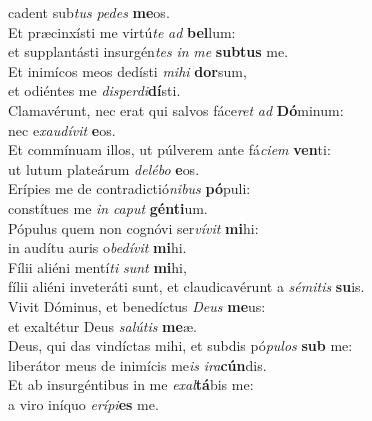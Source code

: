 \evenverse cadent sub\textit{tus} \textit{pe}\textit{des} \textbf{me}os.\\
\oddverse Et præcinxísti me virtú\textit{te} \textit{ad} \textbf{bel}lum:~\*\\
\oddverse et supplantásti insurgén\textit{tes} \textit{in} \textit{me} \textbf{sub}\textbf{tus} me.\\
\evenverse Et inimícos meos dedísti \textit{mi}\textit{hi} \textbf{dor}sum,~\*\\
\evenverse et odiéntes me \textit{di}\textit{sper}\textit{di}\textbf{dí}sti.\\
\oddverse Clamavérunt, nec erat qui salvos fáce\textit{ret} \textit{ad} \textbf{Dó}minum:~\*\\
\oddverse nec e\textit{xau}\textit{dí}\textit{vit} \textbf{e}os.\\
\evenverse Et commínuam illos, ut púlverem ante fá\textit{ci}\textit{em} \textbf{ven}ti:~\*\\
\evenverse ut lutum plateárum \textit{de}\textit{lé}\textit{bo} \textbf{e}os.\\
\oddverse Erípies me de contradictió\textit{ni}\textit{bus} \textbf{pó}puli:~\*\\
\oddverse constítues me \textit{in} \textit{ca}\textit{put} \textbf{gén}\textbf{ti}um.\\
\evenverse Pópulus quem non cognóvi ser\textit{ví}\textit{vit} \textbf{mi}hi:~\*\\
\evenverse in audítu auris o\textit{be}\textit{dí}\textit{vit} \textbf{mi}hi.\\
\oddverse Fílii aliéni mentí\textit{ti} \textit{sunt} \textbf{mi}hi,~\*\\
\oddverse fílii aliéni inveteráti sunt, et claudicavérunt a \textit{sé}\textit{mi}\textit{tis} \textbf{su}is.\\
\evenverse Vivit Dóminus, et benedíctus \textit{De}\textit{us} \textbf{me}us:~\*\\
\evenverse et exaltétur Deus \textit{sa}\textit{lú}\textit{tis} \textbf{me}æ.\\
\oddverse Deus, qui das vindíctas mihi, et subdis pó\textit{pu}\textit{los} \textbf{sub} me:~\*\\
\oddverse liberátor meus de inimícis me\textit{is} \textit{i}\textit{ra}\textbf{cún}dis.\\
\evenverse Et ab insurgéntibus in me \textit{e}\textit{xal}\textbf{tá}bis me:~\*\\
\evenverse a viro iníquo \textit{e}\textit{rí}\textit{pi}\textbf{es} me.\\
